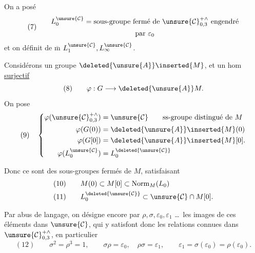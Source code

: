 On a posé
\[
(7)\qquad
\begin{gathered}
L_0^{\unsure{\mathcal C}}=\text{sous-groupe fermé de }
\unsure{\mathcal C}_{0,3}^{+\wedge}\text{ engendré}\\
\text{par }\varepsilon_0
\end{gathered}
\]
et on définit de $\overline{\mathrm m}$ $L_1^{\unsure{\mathcal C}},L_{\infty}^{\unsure{\mathcal C}}$.

Considérons un groupe 
$\deleted{\unsure{A}}\inserted{M}$, et un hom 
\uline{surjectif}
\[
(8)\qquad \varphi:G\longrightarrow\deleted{\unsure{A}}M.
\]
On pose
\[
(9)\quad
\left\{\begin{aligned}
\varphi(\unsure{\mathcal C}_{0,3}^{+\wedge})
 &=\unsure{\mathcal C}\qquad\text{ss-groupe distingué de }M\\
\varphi(G(0))&=\deleted{\unsure{A}}\inserted{M}(0)\\
\varphi(G[0])&=\deleted{\unsure{A}}\inserted{M}[0].\\
\varphi(L_0^{\unsure{\mathcal C}})&=L_0^{\deleted{\unsure{\mathcal C}}}
\end{aligned}\right.
\]


Donc ce sont des sous-groupes fermés de $M$, satisfaisant
\[
\begin{aligned}
(10)\qquad&M(0)\subset M[0]\subset\operatorname{Norm}_{M}(L_0)\\
(11)\qquad&L_0^{\deleted{\unsure{\mathcal C}}}
\subset\unsure{\mathcal C}\cap M[0].
\end{aligned}
\]

Par abus de langage, on désigne encore par $\rho,\sigma,\varepsilon_0,\varepsilon_1$
\ldots\ les images de ces éléments dans $\unsure{\mathcal C}$, qui y
satisfont donc les relations connues dans $\unsure{\mathcal C}_{0,3}^{+\wedge}$,
en particulier
\[
(12)\qquad
\sigma^2=\rho^3=1,\qquad
\sigma\rho=\varepsilon_0,\quad \rho\sigma=\varepsilon_1,\qquad
\varepsilon_1=\sigma(\varepsilon_0)=\rho(\varepsilon_0).
\]

